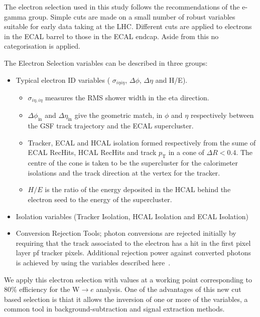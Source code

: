 The electron selection used in this study follows the recommendations of the e-gamma group\cite{elsel}. Simple cuts are made on a small number of robust variables suitable for early data taking at the LHC. Different cuts are applied to electrons in the ECAL barrel to those in the ECAL endcap. Aside from this no categorisation is applied. 

The Electron Selection  variables can be described in three groups: 
\begin{itemize}
\item Typical electron ID variables ( $\sigma_{i\eta i\eta}$, $\Delta \phi$, $\Delta \eta$ and H/E).
\begin{itemize}
\item $\sigma_{i\eta, i\eta}$ measures the RMS shower width in the eta direction.
\item $\Delta \phi_{\textrm{in}}$ and $\Delta \eta_{\textrm{in}}$ give the geometric match, in $\phi$ and $\eta$ respectively between the GSF track trajectory and the ECAL supercluster.
\item Tracker, ECAL and HCAL isolation formed respectively from the sume of ECAL RecHits, HCAL RecHits and track $p_{\textrm{T}}$ in a cone of $\Delta R < 0.4$. The centre of the cone is taken to be the supercluster for the calorimeter isolations and the track direction at the vertex for the tracker.
\item $H/E$ is the ratio of the energy deposited in the HCAL behind the electron seed to the energy of the supercluster.

\end{itemize}
\item Isolation variables (Tracker Isolation, HCAL Isolation and ECAL Isolation)
\item Conversion Rejection Tools; photon conversions are rejected initially by requiring that the track associated to the electron has a hit in the first pixel layer pf tracker pixels. Additional rejection power against converted photons is achieved by using the variables described here~\cite{conv}.
\end{itemize}

We apply this electron selection with values at a working point corresponding to 80\% efficiency for the W$\rightarrow e$ analysis. One of the advantages of this new cut based selection is thiat it allows the inversion of one or more of the variables, a common tool in background-subtraction and signal extraction methods.

